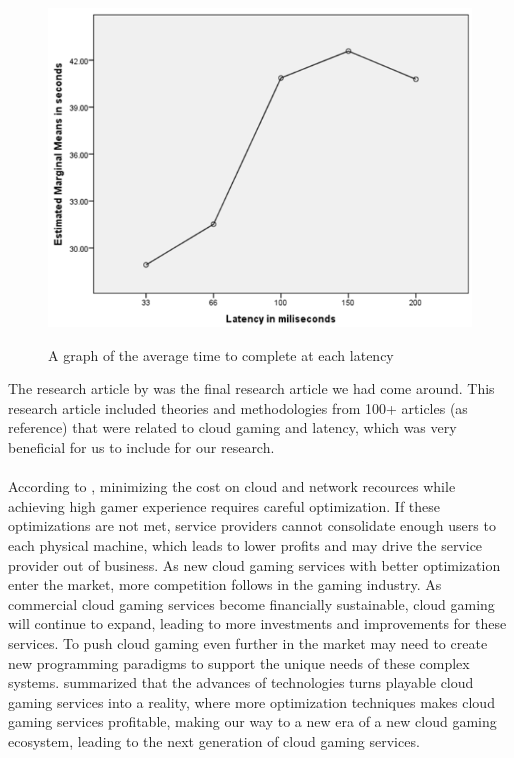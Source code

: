 \begin{figure}[H]
	\centering
	\includegraphics[width=12cm]{../img/fig25.png}
	\caption{A graph of the average time to complete at each latency}
	\parencite[Chapter 4.1, Page 15, Figure 4.1]{claypool2014effects}
\end{figure}
\newpage
The research article  by \citeauthor{7536162} was the final research article we had come around. This research article included theories and methodologies from 100+ articles (as reference) that were related to cloud gaming and latency, which was very beneficial for us to include for our research.\\\\
According to \textcite[Chapter VI]{7536162}, minimizing the cost on cloud and network recources while achieving high gamer experience requires careful optimization. If these optimizations are not met, service providers cannot consolidate enough users to each physical machine, which leads to lower profits and may drive the service provider out of business. As new cloud gaming services with better optimization enter the market, more competition follows in the gaming industry. As commercial cloud gaming services become financially sustainable, cloud gaming will continue to expand, leading to more investments and improvements for these services. To push cloud gaming even further in the market may need to create new programming paradigms to support the unique needs of these complex systems. \textcite[Chapter VI]{7536162} summarized that the advances of technologies turns playable cloud gaming services into a reality, where more optimization techniques makes cloud gaming services profitable, making our way to a new era of a new cloud gaming ecosystem, leading to the next generation of cloud gaming services.